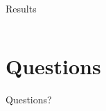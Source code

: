 \documentclass{beamer}
\begin{document}
\begin{frame}{Results}
\begin{columns}
\begin{column}{0.5\textwidth}
\end{column}

\end{columns}
\end{frame} 

\section*{Questions}
\begin{frame}
\begin{LARGE}
\begin{center}
Questions?
\end{center}
\end{LARGE}
\end{frame}
\end{document}
